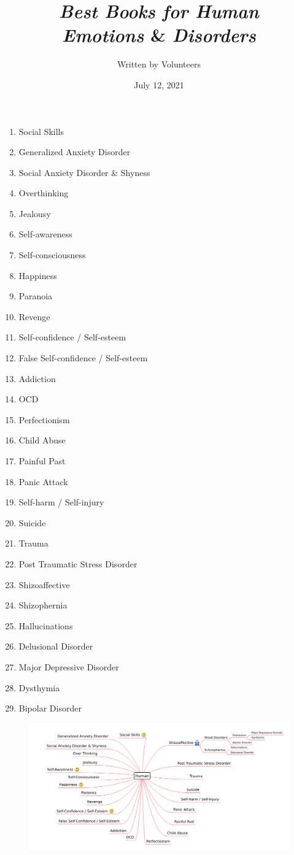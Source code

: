 \documentclass[12pt, a4paper]{article}
\title{\emph{Best Books for Human\\Emotions} \& \emph{Disorders}}
\author{Written by Volunteers}
\date{July 12, 2021}
\begin{document}
\maketitle
\begin{enumerate}
    \item Social Skills
    \item Generalized Anxiety Disorder
    \item Social Anxiety Disorder \& Shyness
    \item Overthinking
    \item Jealousy
    \item Self-awareness
    \item Self-consciousness
    \item Happiness
    \item Paranoia
    \item Revenge
    \item Self-confidence / Self-esteem
    \item False Self-confidence / Self-esteem
    \item Addiction
    \item OCD
    \item Perfectionism
    \item Child Abuse
    \item Painful Past
    \item Panic Attack
    \item Self-harm / Self-injury
    \item Suicide
    \item Trauma
    \item Post Traumatic Stress Disorder
    \item Shizoaffective
    \item Shizophernia
    \item Hallucinations
    \item Delusional Disorder
    \item Major Depressive Disorder
    \item Dysthymia
    \item Bipolar Disorder
\end{enumerate}

\begin{figure}[hb]\centering
    \includegraphics[width=\textwidth]{human.png}
\end{figure}
\end{document}
